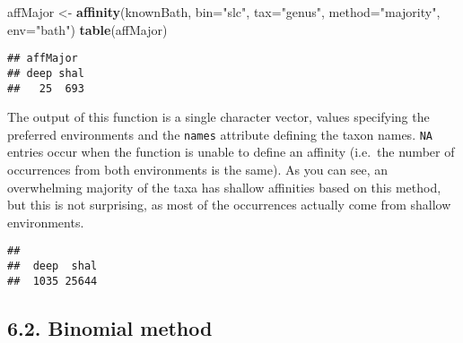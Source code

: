 \documentclass[]{article}
\newenvironment{Shaded}{\begin{snugshade}}{\end{snugshade}}
\newcommand{\DataTypeTok}[1]{\textcolor[rgb]{0.13,0.29,0.53}{#1}}
\newcommand{\KeywordTok}[1]{\textcolor[rgb]{0.13,0.29,0.53}{\textbf{#1}}}
\newcommand{\NormalTok}[1]{#1}
\newcommand{\OperatorTok}[1]{\textcolor[rgb]{0.81,0.36,0.00}{\textbf{#1}}}
\newcommand{\StringTok}[1]{\textcolor[rgb]{0.31,0.60,0.02}{#1}}
\begin{document}
\begin{Shaded}
\begin{Highlighting}[]
\NormalTok{affMajor <-}\StringTok{ }\KeywordTok{affinity}\NormalTok{(knownBath, }\DataTypeTok{bin=}\StringTok{"slc"}\NormalTok{, }\DataTypeTok{tax=}\StringTok{"genus"}\NormalTok{, }
  \DataTypeTok{method=}\StringTok{"majority"}\NormalTok{, }\DataTypeTok{env=}\StringTok{"bath"}\NormalTok{)}
\KeywordTok{table}\NormalTok{(affMajor)}
\end{Highlighting}
\end{Shaded}

\begin{verbatim}
## affMajor
## deep shal 
##   25  693
\end{verbatim}

The output of this function is a single character vector, values
specifying the preferred environments and the \texttt{names} attribute
defining the taxon names. \texttt{NA} entries occur when the function is
unable to define an affinity (i.e.~the number of occurrences from both
environments is the same). As you can see, an overwhelming majority of
the taxa has shallow affinities based on this method, but this is not
surprising, as most of the occurrences actually come from shallow
environments.

\begin{Shaded}
\end{Shaded}

\begin{verbatim}
## 
##  deep  shal 
##  1035 25644
\end{verbatim}

\hypertarget{binomial-method}{%
\subsection{6.2. Binomial method}\label{binomial-method}}
\end{document}

